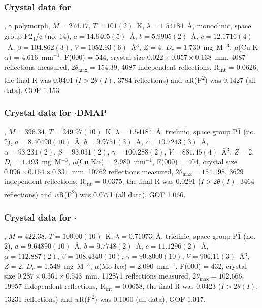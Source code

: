 \begin{refsection}
\subsubsection{Crystal data for \texorpdfstring{}{C13 H9 N O Se}}
, $\gamma$ polymorph, $M=274.17$, $T=101(2)$~K, $\lambda=1.54184$~\AA, monoclinic, space group P2\textsubscript{1}/c (no. 14), $a = 14.9405(5)$~\AA, $b = 5.9905(2)$~\AA, $c = 12.1716(4)$~\AA, $\beta = 104.862(3)$\degree, $V = 1052.93(6)$~\AA$^{3}$, $Z = 4$. $D_{c}= 1.730$~mg~M$^{-3}$, $\mu$(Cu K$\alpha$) = 4.616~mm$^{-1}$, F(000) = 544, crystal size $0.022 \times 0.057 \times 0.138$~mm. 4087 reflections measured, $2\theta_{\mathrm{max}}=154.39$\degree, 4087 independent reflections, R\textsubscript{int} = 0.0626, the final R was 0.0401 ($I > 2\theta(I)$, 3784 reflections) and \emph{w}R(F\textsuperscript{2}) was 0.1427 (all data), GOF 1.153.

\subsubsection{Crystal data for \texorpdfstring{$\cdot$DMAP}{C20 H19 N3 O Se}}
, $M=396.34$, $T=249.97(10)$~K, $\lambda=1.54184$~\AA, triclinic, space group P$\bar{1}$ (no. 2), $a = 8.40490(10)$~\AA, $b = 9.9751(3)$~\AA, $c = 10.7243(3)$~\AA, $\alpha = 93.231(2)$\degree, $\beta = 93.031(2)$\degree, $\gamma = 100.288(2)$\degree, $V = 881.45(4)$~\AA$^{3}$, $Z = 2$. $D_{c}= 1.493$~mg~M$^{-3}$, $\mu$(Cu K$\alpha$) = 2.980~mm$^{-1}$, F(000) = 404, crystal size $0.096 \times 0.164 \times 0.331$~mm. 10762 reflections measured, $2\theta_{\mathrm{max}}=154.198$\degree, 3629 independent reflections, R\textsubscript{int} = 0.0375, the final R was 0.0291 ($I > 2\theta(I)$, 3464 reflections) and \emph{w}R(F\textsuperscript{2}) was 0.0771 (all data), GOF 1.066.

\subsubsection{Crystal data for \texorpdfstring{$\cdot$}{C22 H21 N3 O Se}}
, $M=422.38$, $T=100.00(10)$~K, $\lambda=0.71073$~\AA, triclinic, space group P$\bar{1}$ (no. 2), $a = 9.64890(10)$~\AA, $b = 9.7748(2)$~\AA, $c = 11.1296(2)$~\AA, $\alpha = 112.887(2)$\degree, $\beta = 108.4340(10)$\degree, $\gamma = 90.8000(10)$\degree, $V = 906.11(3)$~\AA$^{3}$, $Z = 2$. $D_{c}= 1.548$~mg~M$^{-3}$, $\mu$(Mo K$\alpha$) = 2.090~mm$^{-1}$, F(000) = 432, crystal size $0.287 \times 0.361 \times 0.543$~mm. 112871 reflections measured, $2\theta_{\mathrm{max}}=102.666$\degree, 19957 independent reflections, R\textsubscript{int} = 0.0658, the final R was 0.0423 ($I > 2\theta(I)$, 13231 reflections) and \emph{w}R(F\textsuperscript{2}) was 0.1000 (all data), GOF 1.017.


\end{refsection}
